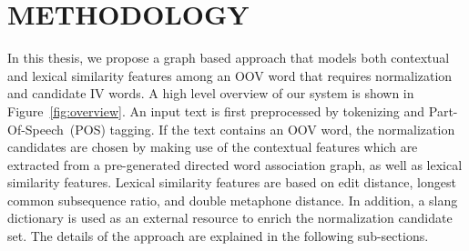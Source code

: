\documentclass[a4paper,onesided,12pt]{report}
\begin{document}


\chapter{METHODOLOGY}
\label{chapter:method}



In this thesis, we propose a graph based approach that models both contextual and lexical similarity features among an OOV word that requires normalization and candidate IV words. A high level overview of our system is shown in Figure~\ref{fig:overview}. An input text is first preprocessed by tokenizing and Part-Of-Speech~(POS) tagging. If the text contains an OOV word, the normalization candidates are chosen by making use of the contextual features which are extracted from a pre-generated directed word association graph, as well as lexical similarity features. Lexical similarity features are based on edit distance, longest common subsequence ratio, and double metaphone distance. In addition, a slang dictionary is used as an external resource to enrich the normalization candidate set. The details of the approach are explained in the following sub-sections.
\end{document}
